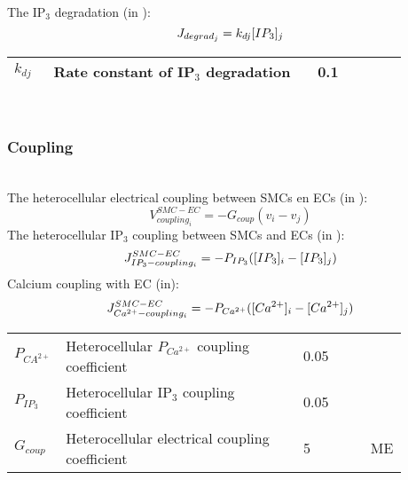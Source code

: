 \\
%
The IP$_{3}$ degradation (in \uMs):  
\begin{equation} \label{eq:Jdegradj}
J_{degrad_{j}}= k_{dj} [IP_{3}]_{j}
\end{equation}
%
\begin{table}[h!]
\centering
\begin{tabular}{| p{0.09\linewidth} | >{\footnotesize} p{0.6\linewidth} | >{\footnotesize} p{0.17\linewidth} | >{\footnotesize} p{0.02\linewidth} |}
\arrayrulecolor{lightgrey}\hline
$k_{dj}$      			& Rate constant of IP$_{3}$ degradation						 		& 0.1 \pers		& \cite{Koenigsberger2006} \\
\hline
\end{tabular}
\label{tab:Jdegradj}
\end{table}
\\
%
%
\subsubsection{Coupling}~\\
%
The heterocellular electrical coupling between SMCs en ECs (in \mVs):
\begin{equation} \label{eq:Vcouplingi}
V_{coupling_{i}}^{SMC-EC}= -G_{coup}(v_{i}-v_{j})
\end{equation}
%
The heterocellular IP$_{3}$ coupling between SMCs and ECs (in \uMs):
\begin{equation} \label{eq:JIP3couplingi}
J_{IP_{3}-coupling_{i}}^{SMC-EC}= -P_{IP_{3}}([IP_{3}]_{i}-[IP_{3}]_{j})
\end{equation}
%
Calcium coupling with EC (in\uMs):
\begin{equation} \label{eq:JCAcouplingi}
J_{Ca^{2+}-coupling_{i}}^{SMC-EC}= -P_{Ca^{2+}}([Ca^{2+}]_{i}-[Ca^{2+}]_{j})
\end{equation}
%
\begin{table}[h!]
\centering
\begin{tabular}{| p{0.09\linewidth} | >{\footnotesize} p{0.6\linewidth} | >{\footnotesize} p{0.17\linewidth} | >{\footnotesize} p{0.02\linewidth} |}
\arrayrulecolor{lightgrey}\hline
$P_{CA^{2+}}$      		& Heterocellular $P_{Ca^{2+}}$ coupling coefficient	& 0.05 \pers	&  \cite{Koenigsberger2006} \\
$P_{IP_{3}}$      		& Heterocellular IP$_{3}$ coupling coefficient	& 0.05 \pers	&  \cite{Koenigsberger2006} \\
$G_{coup}$      		& Heterocellular electrical coupling coefficient		& 5 \pers	& ME \\
\hline
\end{tabular}
\label{tab:JCA3couplingi}
\end{table}
%
\newpage
